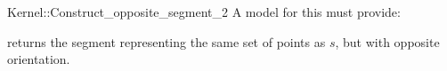 \begin{ccRefFunctionObjectConcept}{Kernel::Construct_opposite_segment_2}
A model for this must provide:


{returns the segment representing the same set of points as $s$,
but with opposite orientation.}

\end{ccRefFunctionObjectConcept}
